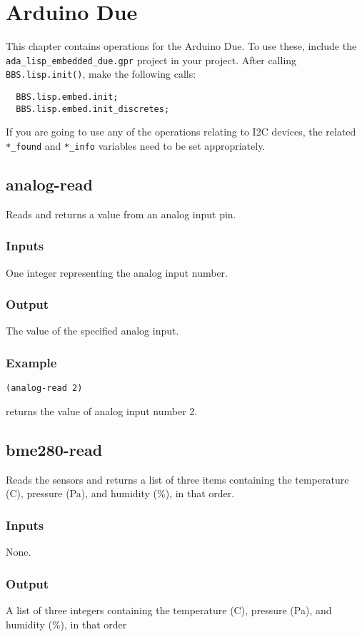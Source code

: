 \documentclass[10pt, openany]{book}
\newcommand{\package}[1]{\texttt{#1}}
\begin{document}
\chapter{Arduino Due}
This chapter contains operations for the Arduino Due.  To use these, include the \package{ada\_lisp\_embedded\_due.gpr} project in your project.  After calling \package{BBS.lisp.init()}, make the following calls:
\lstset{language=Ada}
\begin{lstlisting}
  BBS.lisp.embed.init;
  BBS.lisp.embed.init_discretes;
\end{lstlisting}
If you are going to use any of the operations relating to I2C devices, the related \package{*\_found} and \package{*\_info} variables need to be set appropriately.


\section{analog-read}
Reads and returns a value from an analog input pin.
\subsection{Inputs}
One integer representing the analog input number.
\subsection{Output}
The value of the specified analog input.
\subsection{Example}
\lstset{language=[Tiny]Lisp}
\begin{lstlisting}
(analog-read 2)
\end{lstlisting}
returns the value of analog input  number 2.

\section{bme280-read}
Reads the sensors and returns a list of three items containing the temperature (\degree{}C), pressure (Pa), and humidity (\%), in that order.
\subsection{Inputs}
None.
\subsection{Output}
A list of three integers containing the temperature (\degree{}C), pressure (Pa), and humidity (\%), in that order
\end{document}
